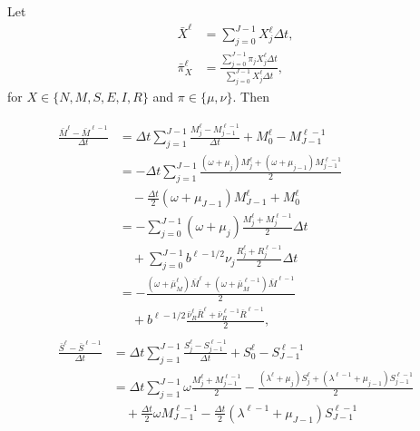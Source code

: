 \documentclass{jpmarticle}
\let\subequationsorig\subequations%
\let\endsubequationsorig\endsubequations%
\renewenvironment{subequations}{
  \subequationsorig
  \renewcommand{\theequation}{\theparentequation.\arabic{equation}}
}{
  \endsubequationsorig
}
\begin{document}
Let
\begin{align}
  \bar{X}^{\ell}
  &= \sum_{j = 0}^{J - 1} X_j^{\ell} \Delta t,
  \\
  \bar{\pi}_X^{\ell}
  &= \frac{\sum_{j = 0}^{J - 1} \pi_j X_j^{\ell} \Delta t}
  {\sum_{j = 0}^{J - 1} X_j^{\ell} \Delta t},
\end{align}
for $X \in \{N, M, S, E, I, R\}$ and $\pi \in \{\mu, \nu\}$. Then
\begin{subequations}
  \begin{align}
    \begin{split}
      \frac{\bar{M}^{\ell} - \bar{M}^{\ell - 1}}{\Delta t}
      &= \Delta t \sum_{j = 1}^{J - 1}
      \frac{M_j^{\ell} - M_{j - 1}^{\ell - 1}}{\Delta t}
      + M_0^{\ell} - M_{J - 1}^{\ell - 1}
      \\
      &= - \Delta t \sum_{j = 1}^{J - 1}
      \frac{(\omega + \mu_j) M_j^{\ell}
        + (\omega + \mu_{j - 1}) M_{j - 1}^{\ell - 1}}{2}
      \\ & \quad {}
      - \frac{\Delta t}{2} (\omega + \mu_{J - 1}) M_{J - 1}^{\ell}
      + M_0^{\ell}
      \\
      &= - \sum_{j = 0}^{J - 1}
      (\omega + \mu_j) \frac{M_j^{\ell} + M_j^{\ell - 1}}{2}
      \Delta t
      \\ & \quad {}
      + \sum_{j = 0}^{J - 1}
      b^{\ell - 1 / 2} \nu_j \frac{R_j^{\ell} + R_j^{\ell - 1}}{2}
      \Delta t
      \\
      &= - \frac{(\omega + \bar{\mu}_M^{\ell}) \bar{M}^{\ell}
        + (\omega + \bar{\mu}_M^{\ell - 1}) \bar{M}^{\ell - 1}}{2}
      \\ & \quad {}
      + b^{\ell - 1 / 2}
      \frac{\bar{\nu}_R^{\ell} \bar{R}^{\ell}
        + \bar{\nu}_R^{\ell - 1} \bar{R}^{\ell - 1}}{2},
    \end{split}
    \\
    \begin{split}
      \frac{\bar{S}^{\ell} - \bar{S}^{\ell - 1}}{\Delta t}
      &= \Delta t \sum_{j = 1}^{J - 1}
      \frac{S_j^{\ell} - S_{j - 1}^{\ell - 1}}{\Delta t}
      + S_0^{\ell} - S_{J - 1}^{\ell - 1}
      \\
      &= \Delta t \sum_{j = 1}^{J - 1}
      \omega \frac{M_j^{\ell} + M_{j - 1}^{\ell - 1}}{2}
      - \frac{(\lambda^{\ell} + \mu_j) S_j^{\ell}
        + (\lambda^{\ell - 1} + \mu_{j - 1}) S_{j - 1}^{\ell - 1}}{2}
      \\ & \quad {}
      + \frac{\Delta t}{2}
      \omega M_{J - 1}^{\ell - 1}
      - \frac{\Delta t}{2}
      (\lambda^{\ell - 1} + \mu_{J - 1}) S_{J - 1}^{\ell - 1}

\end{split}
\end{align}
\end{subequations}
\end{document}
